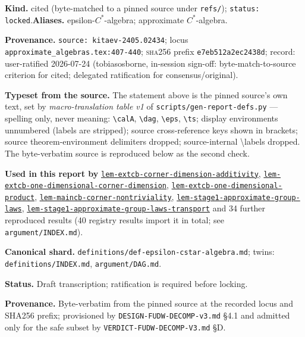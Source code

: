 \begin{defnote}
\textbf{Kind.} cited (byte-matched to a pinned source under \texttt{refs/}); \texttt{status: locked}.\quad\textbf{Aliases.} epsilon-$C^{*}$-algebra; approximate $C^{*}$-algebra.
\par
\textbf{Provenance.} \texttt{source: kitaev-\allowbreak{}2405.\allowbreak{}02434}; locus \texttt{approximate\_algebras.\allowbreak{}tex:\allowbreak{}407-\allowbreak{}440}; \textsc{sha256} prefix \texttt{e7eb512a2ec2438d}; record: user-\allowbreak{}ratified 2026-\allowbreak{}07-\allowbreak{}24 (tobiasosborne,\allowbreak{} in-\allowbreak{}session sign-\allowbreak{}off:\allowbreak{} byte-\allowbreak{}match-\allowbreak{}to-\allowbreak{}source criterion for cited;\allowbreak{} delegated ratification for consensus/\allowbreak{}original).
\par
\textbf{Typeset from the source.} The statement above is the pinned source's own text, set by \emph{macro-translation table v1} of \texttt{scripts/gen-report-defs.py} --- spelling only, never meaning: \texttt{\textbackslash{}calA}, \texttt{\textbackslash{}dag}, \texttt{\textbackslash{}eps}, \texttt{\textbackslash{}ts}; display environments unnumbered (labels are stripped); source cross-reference keys shown in brackets; source theorem-environment delimiters dropped; source-internal \textbackslash{}labels dropped. The byte-verbatim source is reproduced below as the second check.
\par
\textbf{Used in this report by} \hyperref[lem:extcb-corner-dimension-additivity]{\texttt{lem-\allowbreak{}extcb-\allowbreak{}corner-\allowbreak{}dimension-\allowbreak{}additivity}}, \hyperref[lem:extcb-one-dimensional-corner-dimension]{\texttt{lem-\allowbreak{}extcb-\allowbreak{}one-\allowbreak{}dimensional-\allowbreak{}corner-\allowbreak{}dimension}}, \hyperref[lem:extcb-one-dimensional-product]{\texttt{lem-\allowbreak{}extcb-\allowbreak{}one-\allowbreak{}dimensional-\allowbreak{}product}}, \hyperref[lem:maincb-corner-nontriviality]{\texttt{lem-\allowbreak{}maincb-\allowbreak{}corner-\allowbreak{}nontriviality}}, \hyperref[lem:stage1-approximate-group-laws]{\texttt{lem-\allowbreak{}stage1-\allowbreak{}approximate-\allowbreak{}group-\allowbreak{}laws}}, \hyperref[lem:stage1-approximate-group-laws-transport]{\texttt{lem-\allowbreak{}stage1-\allowbreak{}approximate-\allowbreak{}group-\allowbreak{}laws-\allowbreak{}transport}} and 34 further reproduced results (40 registry results import it in total; see \texttt{argument/INDEX.md}).
\par
\textbf{Canonical shard.} \texttt{definitions/\allowbreak{}def-\allowbreak{}epsilon-\allowbreak{}cstar-\allowbreak{}algebra.\allowbreak{}md}; twins: \texttt{definitions/INDEX.md}, \texttt{argument/DAG.md}.
\par
\textbf{Status.} Draft transcription; ratification is required before locking.

\textbf{Provenance.} Byte-verbatim from the pinned source at the recorded locus
and SHA256 prefix; provisioned by \texttt{DESIGN-\allowbreak{}FUDW-\allowbreak{}DECOMP-\allowbreak{}v3.\allowbreak{}md} \S{}4.1 and admitted
only for the safe subset by \texttt{VERDICT-\allowbreak{}FUDW-\allowbreak{}DECOMP-\allowbreak{}V3.\allowbreak{}md} \S{}D.
\end{defnote}
